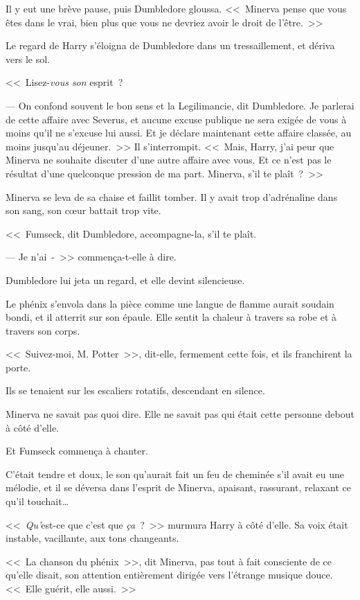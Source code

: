 Il y eut une brève pause, puis Dumbledore gloussa. <<~Minerva pense que vous êtes dans le vrai, bien plus que vous ne devriez avoir le droit de l'être.~>>

Le regard de Harry s'éloigna de Dumbledore dans un tressaillement, et dériva vers le sol.

<<~Lisez-\emph{vous son} esprit~?

--- On confond souvent le bon sens et la Legilimancie, dit Dumbledore. Je parlerai de cette affaire avec Severus, et aucune excuse publique ne sera exigée de vous à moins qu'il ne s'excuse lui aussi. Et je déclare maintenant cette affaire classée, au moins jusqu'au déjeuner.~>> Il s'interrompit. <<~Mais, Harry, j'ai peur que Minerva ne souhaite discuter d'une autre affaire avec vous. Et ce n'est pas le résultat d'une quelconque pression de ma part. Minerva, s'il te plaît~?~>>

Minerva se leva de sa chaise et faillit tomber. Il y avait trop d'adrénaline dans son sang, son cœur battait trop vite.

<<~Fumseck, dit Dumbledore, accompagne-la, s'il te plaît.

--- Je n'ai~-~>> commença-t-elle à dire.

Dumbledore lui jeta un regard, et elle devint silencieuse.

Le phénix s'envola dans la pièce comme une langue de flamme aurait soudain bondi, et il atterrit sur son épaule. Elle sentit la chaleur à travers sa robe et à travers son corps.

<<~Suivez-moi, M. Potter~>>, dit-elle, fermement cette fois, et ils franchirent la porte.

\later

Ils se tenaient sur les escaliers rotatifs, descendant en silence.

Minerva ne savait pas quoi dire. Elle ne savait pas qui était cette personne debout à côté d'elle.

Et Fumseck commença à chanter.

C'était tendre et doux, le son qu'aurait fait un feu de cheminée s'il avait eu une mélodie, et il se déversa dans l'esprit de Minerva, apaisant, rassurant, relaxant ce qu'il touchait…

<<~\emph{Qu'}est-ce que c'est que \emph{ça}~?~>> murmura Harry à côté d'elle. Sa voix était instable, vacillante, aux tons changeants.

<<~La chanson du phénix~>>, dit Minerva, pas tout à fait consciente de ce qu'elle disait, son attention entièrement dirigée vers l'étrange musique douce. <<~Elle guérit, elle aussi.~>>

